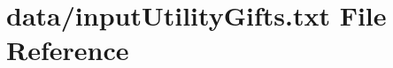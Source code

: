 \hypertarget{inputUtilityGifts_8txt}{}\section{data/input\+Utility\+Gifts.txt File Reference}
\label{inputUtilityGifts_8txt}
